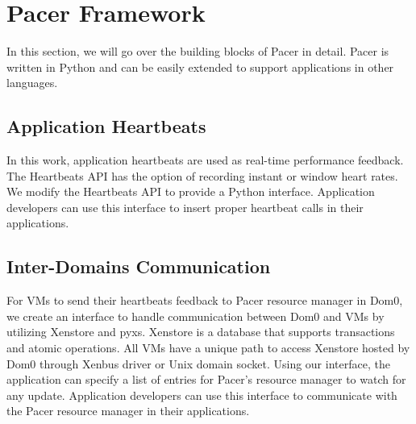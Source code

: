 \section{Pacer Framework}
\label{sf}

In this section, we will go over the building blocks of Pacer in detail. Pacer is written in Python and can be easily extended to support applications in other languages.  

\subsection{Application Heartbeats}
In this work, application heartbeats are used as real-time performance feedback. The Heartbeats API has the option of recording instant or window heart rates. We modify the Heartbeats API\cite{hb} to provide a Python interface.  Application developers can use this interface to insert proper heartbeat calls in their applications.

\subsection{Inter-Domains Communication}
For VMs to send their heartbeats feedback to Pacer resource manager in Dom0, we create an interface to handle communication between Dom0 and VMs by utilizing Xenstore\cite{xenstore} and pyxs\cite{pyxs}. Xenstore is a database that supports transactions and atomic operations. All VMs have a unique path to access Xenstore hosted by Dom0 through Xenbus driver or Unix domain socket\cite{xenbus}. Using our interface, the application can specify a list of entries for Pacer's resource manager to watch for any update. Application developers can use this interface to communicate with the Pacer resource manager in their applications.  



